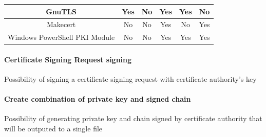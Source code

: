 \documentclass[10pt, a4paper]{report}
\begin{document}
\begin{table}[h!]
\begin{adjustbox}{max width=\textwidth}
\begin{tabular}{|c|c|c|c|c|c|}
GnuTLS                        & \cellcolor[HTML]{34FF34}Yes   & \cellcolor[HTML]{FE0000}No               & \cellcolor[HTML]{34FF34}Yes                    & \cellcolor[HTML]{34FF34}Yes                & \cellcolor[HTML]{FE0000}No                                                  \\ \hline
Makecert	              & \cellcolor[HTML]{FE0000}No    & \cellcolor[HTML]{FE0000}No	 	 & \cellcolor[HTML]{34FF34}Yes	               & \cellcolor[HTML]{FE0000}No                 & \cellcolor[HTML]{34FF34}Yes              		                          \\ \hline
Windows PowerShell PKI Module & \cellcolor[HTML]{FE0000}No    & \cellcolor[HTML]{FE0000}No	         & \cellcolor[HTML]{34FF34}Yes	               & \cellcolor[HTML]{34FF34}Yes	            & \cellcolor[HTML]{34FF34}Yes                                                 \\ \hline
\end{tabular}
\end{adjustbox}
\end{table}

\paragraph{Certificate Signing Request signing}
Possibility of signing a certificate signing request with certificate authority's key

\paragraph{Create combination of private key and signed chain}
Possibility of generating private key and chain signed by certificate authority that will be outputed to a single file
\end{document}
